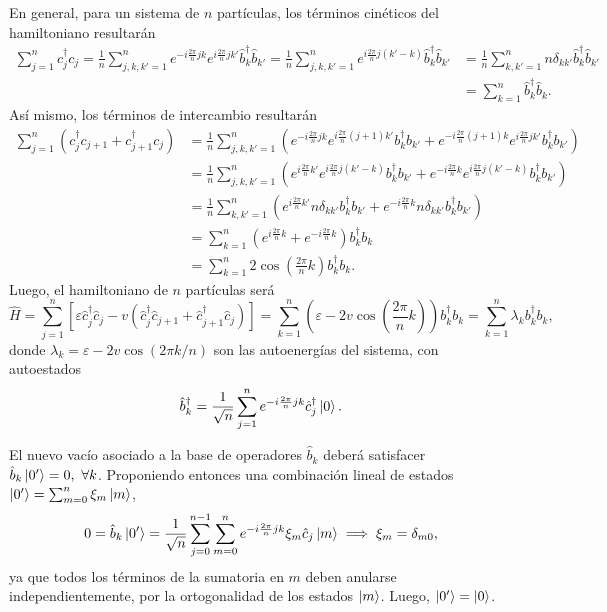 \documentclass{scrartcl}
\newcommand{\inv}[1]{\frac{1}{#1}}
\renewcommand{\b}{\hat{b}}
\renewcommand{\c}{\hat{c}}
\DeclareRobustCommand{\[}{\begin{equation}}
\DeclareRobustCommand{\]}{\end{equation}}
\begin{document}
\begin{enumerate}
\begin{enumerate}
        En general, para un sistema de $n$ partículas, los términos cinéticos del hamiltoniano resultarán
        \begin{align}
            \sum_{j = 1}^n c_j^\dagger c_j = \inv{n} \sum_{j, k, k' = 1}^n e^{-i \frac{2\pi}{n} jk} e^{i \frac{2\pi}{n} jk'} \b_k^\dagger \b_{k'} = \inv{n} \sum_{j, k, k' = 1}^n e^{i \frac{2\pi}{n} j (k' - k)} \b_k^\dagger \b_{k'} &= \inv{n} \sum_{k, k' = 1}^n n \delta_{k k'} \b_k^\dagger \b_{k'} \\
                &= \sum_{k = 1}^n \b_k^\dagger \b_k.
        \end{align}
        Así mismo, los términos de intercambio resultarán
        \begin{align}
            \sum_{j = 1}^n ( c_j^\dagger c_{j + 1} + c_{j + 1}^\dagger c_j) &= \inv{n} \sum_{j, k, k' = 1}^n \left( e^{-i \frac{2\pi}{n} jk} e^{i \frac{2\pi}{n} (j + 1) k'} b_k^\dagger b_{k'} + e^{-i \frac{2\pi}{n} (j + 1) k} e^{i \frac{2\pi}{n} jk'} b_{k}^\dagger b_{k'} \right) \\
                &= \inv{n} \sum_{j, k, k' = 1}^n \left( e^{i \frac{2\pi}{n} k'} e^{i \frac{2\pi}{n} j (k' - k)} b_k^\dagger b_{k'} + e^{-i \frac{2\pi}{n} k} e^{i \frac{2\pi}{n} j(k' - k)} b_{k}^\dagger b_{k'} \right) \\
                &= \inv{n} \sum_{k, k' = 1}^n \left( e^{i \frac{2\pi}{n} k'} n \delta_{k k'} b_k^\dagger b_{k'} + e^{-i \frac{2\pi}{n} k} n \delta_{k k'} b_{k}^\dagger b_{k'} \right) \\
                &= \sum_{k = 1}^n \left( e^{i \frac{2\pi}{n} k} + e^{-i \frac{2\pi}{n} k} \right) b_k^\dagger b_k \\
                &= \sum_{k = 1}^n 2 \cos(\frac{2\pi}{n} k) b_k^\dagger b_k.
        \end{align}
        Luego, el hamiltoniano de $n$ partículas será
        \[ \hat H = \sum_{j = 1}^n \left[ \varepsilon \c_j^\dagger \c_j - v (\c_j^\dagger \c_{j + 1} + \c_{j + 1}^\dagger \c_j) \right] = \sum_{k = 1}^n \left( \varepsilon - 2 v \cos(\frac{2\pi}{n} k) \right) b_k^\dagger b_k = \sum_{k = 1}^n \lambda_k b_k^\dagger b_k, \]
        donde $\lambda_k = \varepsilon - 2v \cos(2\pi k / n)$ son las autoenergías del sistema, con autoestados
        \[ \b_k^\dagger = \inv{\sqrt{n}} \sum_{j = 1}^n e^{-i \frac{2\pi}{n} jk} \c_j^\dagger \ket{0}. \]
        
        El nuevo vacío asociado a la base de operadores $\b_k$ deberá satisfacer $\b_k \ket{0'} = 0, \ \forall k$. Proponiendo entonces una combinación lineal de estados $\ket{0'} = \sum_{m = 0}^n \xi_m \ket{m}$,
        \[ 0 = \b_k \ket{0'} = \inv{\sqrt{n}} \sum_{j = 0}^{n - 1} \sum_{m = 0}^n e^{-i \frac{2\pi}{n} jk} \xi_m \c_j \ket{m} \implies \xi_m = \delta_{m0}, \]
        ya que todos los términos de la sumatoria en $m$ deben anularse independientemente, por la ortogonalidad de los estados $\ket{m}$. Luego, $\ket{0'} = \ket{0}$.
        

\end{enumerate}
\end{enumerate}
\end{document}
